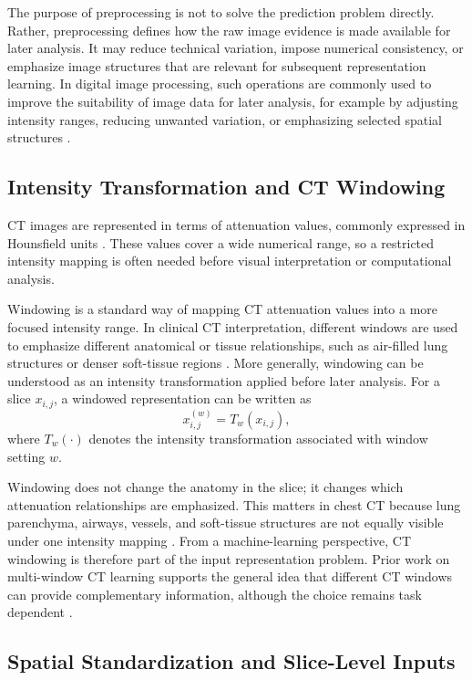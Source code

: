 The purpose of preprocessing is not to solve the prediction problem directly.
Rather, preprocessing defines how the raw image evidence is made available for later analysis. It may reduce technical variation, impose numerical consistency, or emphasize image structures that are relevant for subsequent representation learning. In digital image processing, such operations are commonly used to improve the suitability of image data for later analysis, for example by adjusting intensity ranges, reducing unwanted variation, or emphasizing selected spatial structures \cite{gonzalez2018digital}.


\subsection{Intensity Transformation and CT Windowing}
\label{sec:intensity_windowing_ct}

CT images are represented in terms of attenuation values, commonly expressed in Hounsfield units \cite{whiting2015ctbasic}. These values cover a wide numerical range, so a restricted intensity mapping is often needed before visual interpretation or computational analysis.

Windowing is a standard way of mapping CT attenuation values into a more focused intensity range. In clinical CT interpretation, different windows are used to emphasize different anatomical or tissue relationships, such as air-filled lung structures or denser soft-tissue regions \cite{whiting2015ctbasic}. More generally, windowing can be understood as an intensity transformation applied before later analysis. For a slice \(x_{i,j}\), a windowed representation can be written as
\[
x_{i,j}^{(w)} = T_w(x_{i,j}),
\]
where \(T_w(\cdot)\) denotes the intensity transformation associated with window setting \(w\).

Windowing does not change the anatomy in the slice; it changes which attenuation relationships are emphasized. This matters in chest CT because lung parenchyma, airways, vessels, and soft-tissue structures are not equally visible under one intensity mapping \cite{dejong2005ctairways}. From a machine-learning perspective, CT windowing is therefore part of the input representation problem. Prior work on multi-window CT learning supports the general idea that different CT windows can provide complementary information, although the choice remains task dependent \cite{lu2020multiwindow}.


\subsection{Spatial Standardization and Slice-Level Inputs}
\label{sec:spatial_standardization_slice_inputs}

